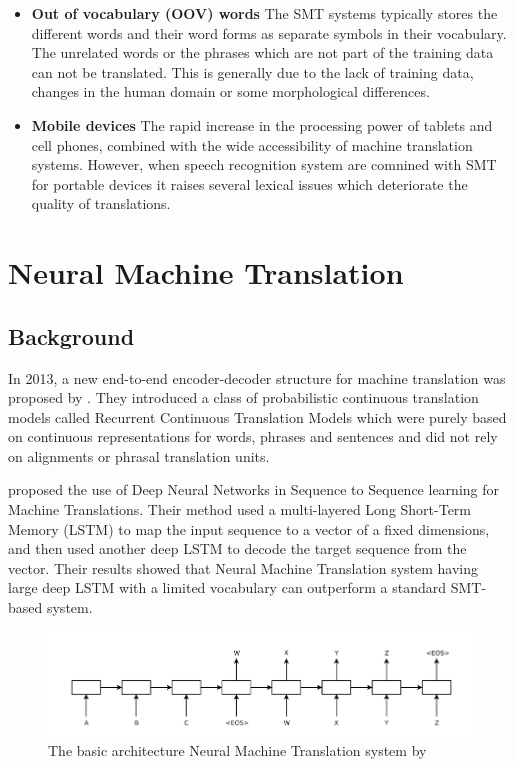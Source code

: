 \begin{itemize}
     \item\textbf{Out of vocabulary (OOV) words}    The SMT systems typically stores the different words and their word forms as separate symbols in their vocabulary. The unrelated words or the phrases which are not part of the training data can not be translated. This is generally due to the lack of training data, changes in the human domain or some morphological differences. 
     \item\textbf{Mobile devices}   The rapid increase in the processing power of tablets and cell phones, combined with the wide accessibility of machine translation systems. However, when speech recognition system are comnined with SMT for portable devices it raises several lexical issues which deteriorate the quality of translations.
     
\end{itemize}
\section{Neural Machine Translation}
\subsection{Background}

In 2013, a new end-to-end encoder-decoder structure for machine translation was proposed by \cite{D13-1176}. They introduced a class of probabilistic continuous translation models called Recurrent Continuous Translation Models which were purely based on continuous representations for words, phrases and sentences and did not rely on alignments or phrasal translation units.

\cite{NIPS2014_5346} proposed the use of Deep Neural Networks in Sequence to Sequence learning for Machine Translations. Their method used a multi-layered Long Short-Term Memory (LSTM) to map the input sequence to a vector of a fixed dimensions, and then used another deep LSTM to decode the
target sequence from the vector. Their results showed that Neural Machine Translation system having large deep LSTM with a limited vocabulary can outperform a standard SMT-based system. 

\begin{figure}[h]
\includegraphics[width=\textwidth]{figures/nmt1.png}
\caption{ The basic architecture Neural Machine Translation system by \cite{NIPS2014_5346} } \label{gnmt1}
\end{figure}

